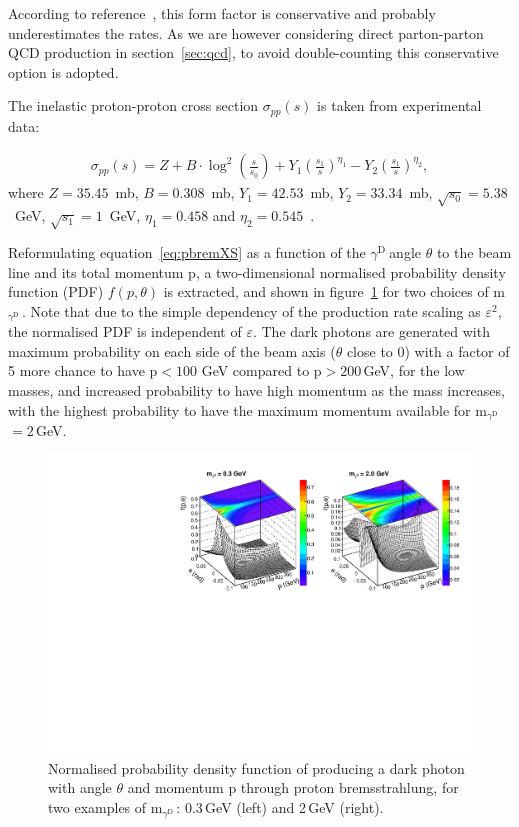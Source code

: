 \documentclass[12pt,a4paper,]{article}
\newcommand{\mathDP}{\gamma^{\mathrm{D}}\ }
\newcommand{\DP}{$\mathDP$}
\newcommand{\mDP}{m$_{\mathDP}$}
\begin{document}
According to reference~\cite{Gorbunov:2014wqa}, this form factor is
conservative and probably underestimates the rates. As we are however
considering direct parton-parton QCD production in
section~\ref{sec:qcd}, to avoid double-counting this conservative
option is adopted.

The inelastic proton-proton cross section $\sigma_{pp}(s)$ is taken
from experimental data:

\begin{align}
\sigma_{pp}(s) = Z + B\cdot \log^2\left(\frac{s}{s_0}\right) + Y_1\left(\frac{s_1}{s}\right)^{\eta_1} - 
Y_2\left(\frac{s_1}{s}\right)^{\eta_2},
\end{align}
where $Z = 35.45$~mb, $B = 0.308$~mb, $Y_1 = 42.53$~mb, $Y_2 = 33.34$~mb, $\sqrt{s_0} = 5.38$~GeV, 
$\sqrt{s_1} = 1$~GeV, $\eta_1 = 0.458$ and $\eta_2 = 0.545$~\cite{Agashe:2014kda}.

Reformulating equation~\ref{eq:pbremXS} as a function of the \DP angle
$\theta$ to the beam line and its total momentum p, a two-dimensional
normalised probability density function (PDF) $f(p, \theta)$ is
extracted, and shown in figure~\ref{fig:pbremPDF} for two choices of
\mDP. Note that due to the simple dependency of the production rate
scaling as $\varepsilon^2$, the normalised PDF is independent of
$\varepsilon$. The dark photons are generated with maximum probability
on each side of the beam axis ($\theta$ close to 0) with a factor of 5
more chance to have p$<100$ GeV compared to p$>200$\,GeV, for the low
masses, and increased probability to have high momentum as the mass
increases, with the highest probability to have the maximum momentum
available for \mDP$=2$\,GeV.

\begin{figure}[h!]
  \centering
\includegraphics[width=1.\textwidth]{figures/pbrem_PDF.pdf}
\caption{Normalised probability density function of producing a dark
  photon with angle $\theta$ and momentum p through proton
  bremsstrahlung, for two examples of \mDP: 0.3\,GeV (left) and
  2\,GeV (right).}
\label{fig:pbremPDF}
\end{figure}
\end{document}

